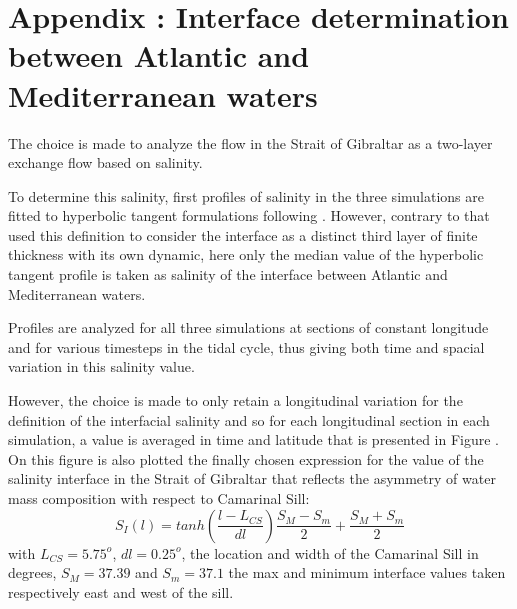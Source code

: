 \section{Appendix : Interface determination between Atlantic and Mediterranean waters}
\label{appendix_interface}

The choice is made to analyze the flow in the Strait of Gibraltar as a two-layer exchange flow based on salinity. 

To determine this salinity, first profiles of salinity in the three simulations are fitted to hyperbolic tangent formulations following \citet{sannino_2007}. However, contrary to \citet{sannino_2007} that used this definition to consider the interface as a distinct third layer of finite thickness with its own dynamic, here only the median value of the hyperbolic tangent profile is taken as salinity of the interface between Atlantic and Mediterranean waters. 


Profiles are analyzed for all three simulations at sections of constant longitude and for various timesteps in the tidal cycle, thus giving both time and spacial variation in this salinity value.

However, the choice is made to only retain a longitudinal variation for the definition of the interfacial salinity and so for each longitudinal section in each simulation, a value is averaged in time and latitude that is presented in Figure . On this figure is also plotted the finally chosen expression for the value of the salinity interface in the Strait of Gibraltar that reflects the asymmetry of water mass composition with respect to Camarinal Sill:
\begin{equation}
	S_I(l)=tanh(\frac{l-L_{CS}}{dl})\frac{S_M-S_m}{2}+\frac{S_M+S_m}{2}
	\label{eqSinterfaceApp}
\end{equation}
with $L_{CS}=5.75^o$, $dl=0.25^o$, the location and width of the Camarinal Sill in degrees, $S_M=37.39$ and $S_m=37.1$ the max and minimum interface values taken respectively east and west of the sill.

